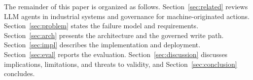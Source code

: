 The remainder of this paper is organized as follows.
Section~\ref{sec:related} reviews LLM agents in industrial systems and
governance for machine-originated actions. Section~\ref{sec:problem} states
the failure model and requirements. Section~\ref{sec:arch} presents the
architecture and the governed write path. Section~\ref{sec:impl} describes
the implementation and deployment. Section~\ref{sec:eval} reports the
evaluation. Section~\ref{sec:discussion} discusses implications, limitations,
and threats to validity, and Section~\ref{sec:conclusion} concludes.

